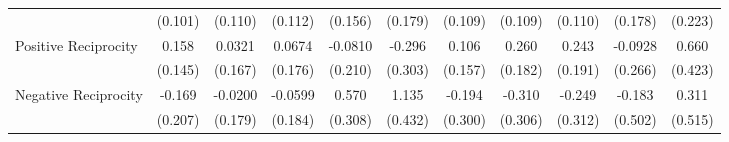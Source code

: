 {\begin{tabular}{l*{10}{c}}
            &     (0.101)         &     (0.110)         &     (0.112)         &     (0.156)         &     (0.179)         &     (0.109)         &     (0.109)         &     (0.110)         &     (0.178)         &     (0.223)         \\
\addlinespace
Positive Reciprocity&       0.158         &      0.0321         &      0.0674         &     -0.0810         &      -0.296         &       0.106         &       0.260         &       0.243         &     -0.0928         &       0.660         \\
            &     (0.145)         &     (0.167)         &     (0.176)         &     (0.210)         &     (0.303)         &     (0.157)         &     (0.182)         &     (0.191)         &     (0.266)         &     (0.423)         \\
\addlinespace
Negative Reciprocity&      -0.169         &     -0.0200         &     -0.0599         &       0.570         &       1.135\sym{**} &      -0.194         &      -0.310         &      -0.249         &      -0.183         &       0.311         \\
            &     (0.207)         &     (0.179)         &     (0.184)         &     (0.308)         &     (0.432)         &     (0.300)         &     (0.306)         &     (0.312)         &     (0.502)         &     (0.515)         \\
\bottomrule
\end{tabular}
}
